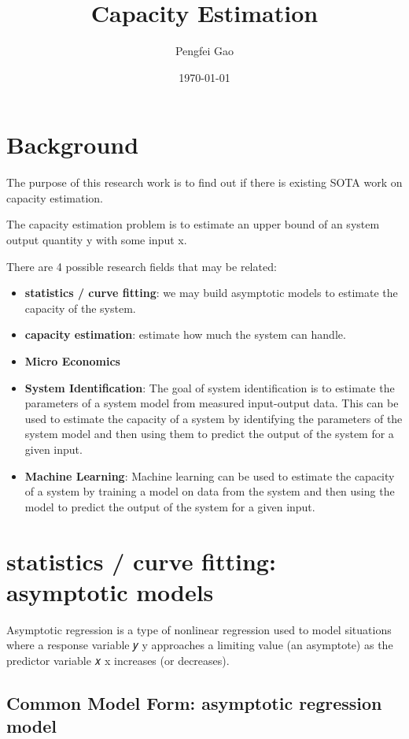 \documentclass{article}
\begin{document}
\title{Capacity Estimation}
\author{Pengfei Gao}
\date{\today}
\maketitle
\tableofcontents



\section{Background}
The purpose of this research work is to find out if there is existing SOTA work on capacity estimation.

The capacity estimation problem is to estimate an upper bound of an system output quantity y with some input x.

There are 4 possible research fields that may be related:
\begin{itemize}
\item \textbf{statistics / curve fitting}: we may build asymptotic models to estimate the capacity of the system.
\item \textbf{capacity estimation}: estimate how much the system can handle.
\item \textbf{Micro Economics}
\item \textbf{System Identification}: The goal of system identification is to estimate the parameters of a system model from measured input-output data. This can be used to estimate the capacity of a system by identifying the parameters of the system model and then using them to predict the output of the system for a given input.
\item \textbf{Machine Learning}: Machine learning can be used to estimate the capacity of a system by training a model on data from the system and then using the model to predict the output of the system for a given input.
\end{itemize}

\section{statistics / curve fitting: asymptotic models}
Asymptotic regression is a type of nonlinear regression used to model situations where a response variable 
𝑦
y approaches a limiting value (an asymptote) as the predictor variable 
𝑥
x increases (or decreases).

\subsection{Common Model Form: asymptotic regression model}
\end{document}
